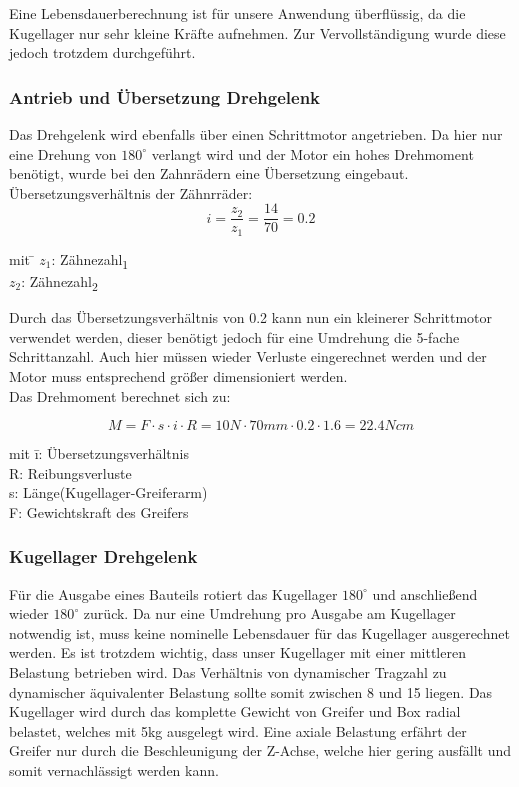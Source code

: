 \documentclass{scrartcl}
\begin{document}
Eine Lebensdauerberechnung ist für unsere Anwendung überflüssig, da die Kugellager nur sehr kleine Kräfte aufnehmen.
Zur Vervollständigung wurde diese jedoch trotzdem durchgeführt.



\subsubsection{Antrieb und Übersetzung Drehgelenk}

Das Drehgelenk wird ebenfalls über einen Schrittmotor angetrieben. Da hier nur eine Drehung von $180^\circ$ verlangt wird und der Motor ein hohes Drehmoment benötigt, wurde bei den Zahnrädern eine Übersetzung eingebaut.\\


Übersetzungsverhältnis der Zähnrräder:
\[i=\frac{z_2}{z_1}=\frac{14}{70}=0.2\]	

\begin{tabbing}
mit \= $z_1$: Zähnezahl\textsubscript{1} \\
    \> $z_2$: Zähnezahl\textsubscript{2} \\
\end{tabbing}

Durch das Übersetzungsverhältnis von 0.2 kann nun ein kleinerer Schrittmotor verwendet werden, dieser benötigt jedoch für eine Umdrehung die 5-fache Schrittanzahl. Auch hier müssen wieder Verluste eingerechnet werden und der Motor muss entsprechend größer dimensioniert werden.\\


Das Drehmoment berechnet sich zu:

\[M=F\cdot s\cdot i\cdot R = 10N\cdot  70mm\cdot 0.2\cdot 1.6 = 22.4Ncm\]

\begin{tabbing}
mit \= i: Übersetzungsverhältnis\\
    \> R: Reibungsverluste \\
		\> s: Länge(Kugellager-Greiferarm)\\
		\> F: Gewichtskraft des Greifers\\
\end{tabbing}





\subsubsection{Kugellager Drehgelenk}

Für die Ausgabe eines Bauteils rotiert das Kugellager $180^\circ$ und anschließend wieder $180^\circ$ zurück. Da nur eine Umdrehung pro Ausgabe am Kugellager notwendig ist, muss keine nominelle Lebensdauer für das Kugellager ausgerechnet werden. Es ist trotzdem wichtig, dass unser Kugellager mit einer mittleren Belastung betrieben wird. Das Verhältnis von dynamischer Tragzahl zu dynamischer äquivalenter Belastung sollte somit zwischen 8 und 15 liegen. Das Kugellager wird durch das komplette Gewicht von Greifer und Box radial belastet, welches mit 5kg ausgelegt wird. Eine axiale Belastung erfährt der Greifer nur durch die Beschleunigung der Z-Achse, welche hier gering ausfällt und somit vernachlässigt werden kann. 
\end{document}
